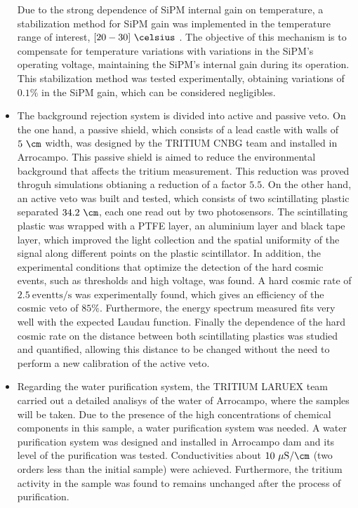 \begin{itemize}

Due to the strong dependence of SiPM internal gain on temperature, a stabilization method for SiPM gain was implemented in the temperature range of interest, $[20-30]~\celsius$ . The objective of this mechanism is to compensate for temperature variations with variations in the SiPM's operating voltage, maintaining the SiPM's internal gain during its operation. This stabilization method was tested experimentally, obtaining variations of $0.1\%$ in the SiPM gain, which can be considered negligibles.

\item{} The background rejection system is divided into active and passive veto. On the one hand, a passive shield, which consists of a lead castle with walls of $5~\cm$ width, was designed by the TRITIUM CNBG team and installed in Arrocampo. This passive shield is aimed to reduce the environmental background that affects the tritium measurement. This reduction was proved throguh simulations obtianing a reduction of a factor $5.5$. On the other hand, an active veto was built and tested, which consists of two scintillating plastic separated $34.2~\cm$, each one read out by two photosensors. The scintillating plastic was wrapped with a PTFE layer, an aluminium layer and black tape layer, which improved the light collection and the spatial uniformity of the signal along different points on the plastic scintillator. In addition, the experimental conditions that optimize the detection of the hard cosmic events, such as thresholds and high voltage, was found. A hard cosmic rate of $2.5~\text{eventts}/\text{s}$ was experimentally found, which gives an efficiency of the cosmic veto of $85\%$. Furthermore, the energy spectrum measured fits very well with the expected Laudau function. Finally the dependence of the hard cosmic rate on the distance between both scintillating plastics was studied and quantified, allowing this distance to be changed without the need to perform a new calibration of the active veto.

\item{} Regarding the water purification system, the TRITIUM LARUEX team carried out a detailed analisys of the water of Arrocampo, where the samples will be taken. Due to the presence of the high concentrations of chemical components in this sample, a water purification system was needed. A water purification system was designed and installed in Arrocampo dam and its level of the purification was tested. Conductivities about $10~\mu\text{S}/\cm$ (two orders less than the initial sample) were achieved. Furthermore, the tritium activity in the sample was found to remains unchanged after the process of purification.

\end{itemize}

